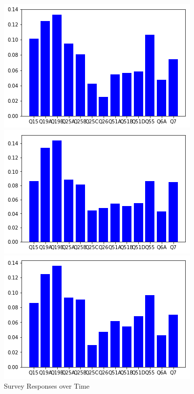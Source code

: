 {\begin{figure}[t!]
	\caption{Survey Responses over Time}
	\begin{minipage}{0.24\textwidth}
		\includegraphics[width=\linewidth]{Images/true_2005.png}
	\end{minipage}\hfill
	\begin{minipage}{0.24\textwidth}
		\includegraphics[width=\linewidth]{Images/true_2008.png}
	\end{minipage}\hfill
	\begin{minipage}{0.24\textwidth}%
		\includegraphics[width=\linewidth]{Images/true_2011.png}

\end{minipage}
\end{figure}}
